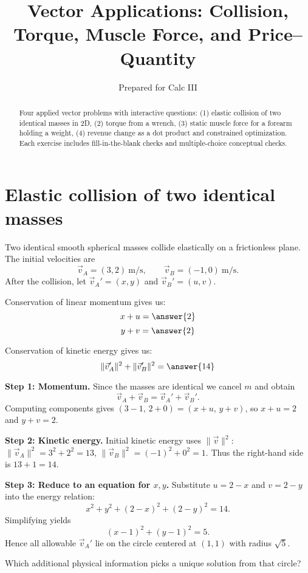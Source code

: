\documentclass{ximera}
\title{Vector Applications: Collision, Torque, Muscle Force, and Price--Quantity}
\author{Prepared for Calc III}
\begin{document}
\begin{abstract}
Four applied vector problems with interactive questions: (1) elastic collision of two identical masses in 2D, (2) torque from a wrench, (3) static muscle force for a forearm holding a weight, (4) revenue change as a dot product and constrained optimization. Each exercise includes fill-in-the-blank checks and multiple-choice conceptual checks.
\end{abstract}

\maketitle

\section{Elastic collision of two identical masses}

\begin{problem}
Two identical smooth spherical masses collide elastically on a frictionless plane. The initial velocities are
\[
\vec v_A=(3,2)\ \text{m/s}, \qquad \vec v_B=(-1,0)\ \text{m/s}.
\]
After the collision, let \(\vec v_A'=(x,y)\) and \(\vec v_B'=(u,v)\).

Conservation of linear momentum gives us:
\[
x+u=\answer{2}
\]
\[
y+v=\answer{2}
\]

Conservation of kinetic energy gives us:
\[
\|\vec v_A'\|^2 + \|\vec v_B'\|^2 = \answer{14}
\]
\end{problem}

\begin{solution}
\textbf{Step 1: Momentum.} Since the masses are identical we cancel \(m\) and obtain
\[
\vec v_A+\vec v_B = \vec v_A' + \vec v_B'.
\]
Computing components gives \( (3-1,\,2+0)=(x+u,\,y+v)\), so \(x+u=2\) and \(y+v=2\).

\textbf{Step 2: Kinetic energy.} Initial kinetic energy uses \(\|\vec v\|^2\): \(\|\vec v_A\|^2 = 3^2+2^2 =13\), \(\|\vec v_B\|^2 = (-1)^2 + 0^2 = 1\). Thus the right-hand side is \(13+1=14\).

\textbf{Step 3: Reduce to an equation for \(x,y\).} Substitute \(u=2-x\) and \(v=2-y\) into the energy relation:
\[
x^2+y^2 + (2-x)^2+(2-y)^2 = 14.
\]
Simplifying yields
\[
(x-1)^2 + (y-1)^2 = 5.
\]
Hence all allowable \(\vec v_A'\) lie on the circle centered at \((1,1)\) with radius \(\sqrt{5}\).

Which additional physical information picks a unique solution from that circle?
\begin{multipleChoice}
\end{multipleChoice}
\end{solution}
\end{document}
